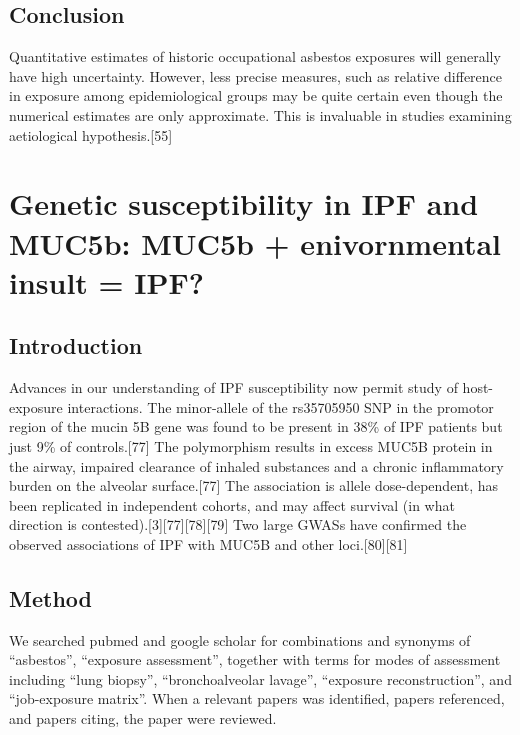 \documentclass[12pt,a4paper,]{report}
\begin{document}
\hypertarget{conclusion-2}{%
\section{Conclusion}\label{conclusion-2}}

Quantitative estimates of historic occupational asbestos exposures will
generally have high uncertainty. However, less precise measures, such as
relative difference in exposure among epidemiological groups may be
quite certain even though the numerical estimates are only approximate.
This is invaluable in studies examining aetiological hypothesis.{[}55{]}

\hypertarget{genetic-susceptibility-in-ipf-and-muc5b-muc5b-enivornmental-insult-ipf}{%
\chapter{Genetic susceptibility in IPF and MUC5b: MUC5b + enivornmental
insult =
IPF?}\label{genetic-susceptibility-in-ipf-and-muc5b-muc5b-enivornmental-insult-ipf}}

\hypertarget{introduction-3}{%
\section{Introduction}\label{introduction-3}}

Advances in our understanding of IPF susceptibility now permit study of
host-exposure interactions. The minor-allele of the rs35705950 SNP in
the promotor region of the mucin 5B gene was found to be present in 38\%
of IPF patients but just 9\% of controls.{[}77{]} The polymorphism
results in excess MUC5B protein in the airway, impaired clearance of
inhaled substances and a chronic inflammatory burden on the alveolar
surface.{[}77{]} The association is allele dose-dependent, has been
replicated in independent cohorts, and may affect survival (in what
direction is contested).{[}3{]}{[}77{]}{[}78{]}{[}79{]} Two large GWASs
have confirmed the observed associations of IPF with MUC5B and other
loci.{[}80{]}{[}81{]}

\hypertarget{method-3}{%
\section{Method}\label{method-3}}

We searched pubmed and google scholar for combinations and synonyms of
``asbestos'', ``exposure assessment'', together with terms for modes of
assessment including ``lung biopsy'', ``bronchoalveolar lavage'',
``exposure reconstruction'', and ``job-exposure matrix''. When a
relevant papers was identified, papers referenced, and papers citing,
the paper were reviewed.
\end{document}
